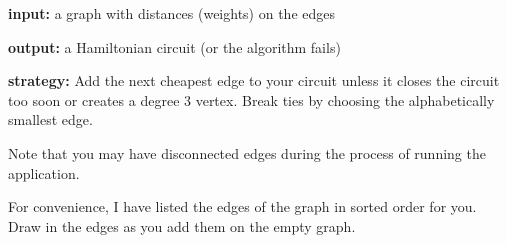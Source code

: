 \documentclass[12pt]{article}
\begin{document}

\textbf{input:} a graph with distances (weights) on the edges

\textbf{output:} a Hamiltonian circuit (or the algorithm fails)

\textbf{strategy:} Add the next cheapest edge to your circuit unless it closes the circuit too soon or creates a degree 3 vertex. Break ties by choosing the alphabetically smallest edge.



Note that you may have disconnected edges during the process of running the application.

\hrulefill

For convenience, I have listed the edges of the graph in sorted order for you. Draw in the edges as you add them on the empty graph. 

\makeatletter
\newcommand{\Letter}[1]{\@Alph{#1}}
\makeatother
\end{document}
